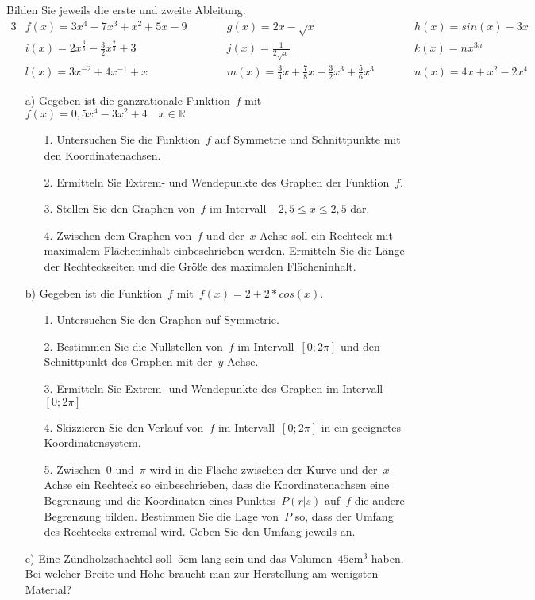 


	Bilden Sie jeweils die erste und zweite Ableitung.
	\begin{alignat*}{3}
		&f(x)=3x^4-7x^3+x^2+5x-9 \qquad && g(x)=2x-\sqrt{x} && h(x)=sin(x)-3x\\
		&i(x)=2x^{\frac{3}{5}}-\frac{3}{2}x^{\frac{2}{3}}+3 && j(x)=\frac{1}{2\sqrt{x}} && k(x)=nx^{3n}\\
		&l(x)=3x^{-2}+4x^{-1}+x && m(x)=\frac{3}{4}x+\frac{7}{8}x-\frac{3}{2}x^3+\frac{5}{6}x^3 \qquad && n(x)=4x+x^2-2x^4
	\end{alignat*}
	\begin{itemize}
		\item[a)] Gegeben ist die ganzrationale Funktion~$f$ mit~$f(x)=0,5x^4-3x^2+4 \quad x \in \mathbb{R}$
	\begin{itemize}
		\item[1.] Untersuchen Sie die Funktion~$f$ auf Symmetrie und Schnittpunkte mit den Koordinatenachsen.
		\item[2.] Ermitteln Sie Extrem- und Wendepunkte des Graphen der Funktion~$f$.
		\item[3.] Stellen Sie den Graphen von~$f$ im Intervall $-2,5\le x \le2,5$ dar.
		\item[4.] Zwischen dem Graphen von~$f$ und der~$x$-Achse soll ein Rechteck mit maximalem Flächeninhalt einbeschrieben werden. Ermitteln Sie die Länge der Rechteckseiten und die Größe des maximalen Flächeninhalt.
	\end{itemize}

		\item[b)] Gegeben ist die Funktion~$f$ mit~$f(x)=2+2*cos(x)$.
	\begin{itemize}
		\item[1.] Untersuchen Sie den Graphen auf Symmetrie.
		\item[2.] Bestimmen Sie die Nullstellen von~$f$ im Intervall~$\left[0;2\pi\right]$ und den Schnittpunkt des Graphen mit der~$y$-Achse.
		\item[3.]Ermitteln Sie Extrem- und Wendepunkte des Graphen im Intervall~$[0;2\pi]$
		\item[4.]Skizzieren Sie den Verlauf von~$f$ im Intervall~$\left[0;2\pi\right]$ in ein geeignetes Koordinatensystem.
		\item[5.]Zwischen~$0$ und~$\pi$ wird in die Fläche zwischen der Kurve und der~$x$-Achse ein Rechteck so einbeschrieben, dass die Koordinatenachsen eine Begrenzung und die Koordinaten eines Punktes~$P\left(r|s\right)$ auf~$f$ die andere Begrenzung bilden. Bestimmen Sie die Lage von~$P$ so, dass der Umfang des Rechtecks extremal wird. Geben Sie den Umfang jeweils an.
	\end{itemize}
	\item[c)] Eine Zündholzschachtel soll~$5\mathrm{cm}$ lang sein und das Volumen~$45\mathrm{cm}^3$ haben. Bei welcher Breite und Höhe braucht man zur Herstellung am wenigsten Material?
	\end{itemize}
\newpage

